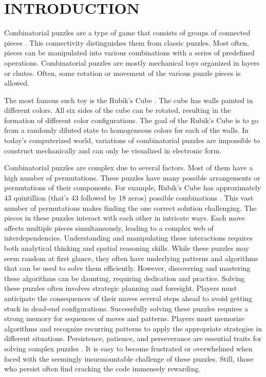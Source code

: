 \documentclass[a4paper,twocolumn,10pt]{article}
\begin{document}
\section{INTRODUCTION}

Combinatorial puzzles \cite{10.1007/3-540-44683-4_3} are a type of game that consists of groups of connected pieces \cite{sun2015computational}. This connectivity distinguishes them from classic puzzles. Most often, pieces can be manipulated into various combinations with a series of predefined operations. Combinatorial puzzles are mostly mechanical toys organized in layers or chutes. Often, some rotation or movement of the various puzzle pieces is allowed. 

The most famous such toy is the Rubik's Cube \cite{openai2019solving}. The cube has walls painted in different colors. All six sides of the cube can be rotated, resulting in the formation of different color configurations. The goal of the Rubik's Cube is to go from a randomly diluted state to homogeneous colors for each of the walls. In today's computerized world, variations of combinatorial puzzles are impossible to construct mechanically and can only be visualized in electronic form.

Combinatorial puzzles are complex due to several factors. Most of them have a high number of permutations. These puzzles have many possible arrangements or permutations of their components. For example, Rubik's Cube has approximately 43 quintillion (that's 43 followed by 18 zeros) possible combinations \cite{10.1007/978-981-13-1132-1_24}. This vast number of permutations makes finding the one correct solution challenging. The pieces in these puzzles interact with each other in intricate ways. Each move affects multiple pieces simultaneously, leading to a complex web of interdependencies. Understanding and manipulating these interactions requires both analytical thinking and spatial reasoning skills. While these puzzles may seem random at first glance, they often have underlying patterns and algorithms that can be used to solve them efficiently. However, discovering and mastering these algorithms can be daunting, requiring dedication and practice. Solving these puzzles often involves strategic planning and foresight. Players must anticipate the consequences of their moves several steps ahead to avoid getting stuck in dead-end configurations. Successfully solving these puzzles requires a strong memory for sequences of moves and patterns. Players must memorize algorithms and recognize recurring patterns to apply the appropriate strategies in different situations. Persistence, patience, and perseverance are essential traits for solving complex puzzles \cite{buhay2023solving}. It is easy to become frustrated or overwhelmed when faced with the seemingly insurmountable challenge of these puzzles. Still, those who persist often find cracking the code immensely rewarding.
\end{document}
